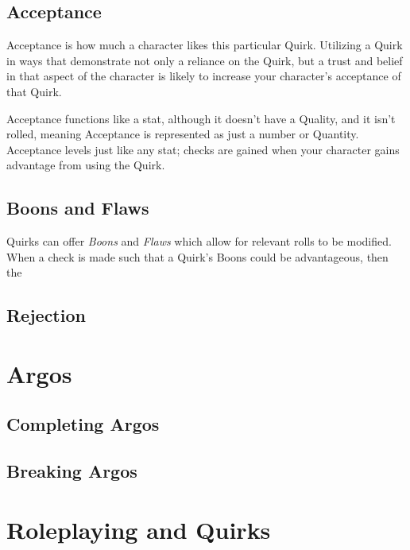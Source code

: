 \documentclass[../main.tex]{subfiles}
\begin{document}
    \subsection{Acceptance}

    Acceptance is how much a character likes this particular Quirk. Utilizing a Quirk in ways that demonstrate not only a reliance on the Quirk, but a trust and belief in that aspect of the character is likely to increase your character's acceptance of that Quirk. 
    
    Acceptance functions like a stat, although it doesn't have a Quality, and it isn't rolled, meaning Acceptance is represented as just a number or Quantity. Acceptance levels just like any stat; checks are gained when your character gains advantage from using the Quirk. 

    \subsection{Boons and Flaws}

    Quirks can offer \emph{Boons} and \emph{Flaws} which allow for relevant rolls to be modified. When a check is made such that a Quirk's Boons could be advantageous, then the 

    
    \subsection{Rejection}



    \section{Argos}

    \subsection{Completing Argos}

    \subsection{Breaking Argos}

    \section{Roleplaying and Quirks}
\end{document}
